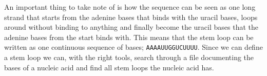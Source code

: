 An important thing to take note of is how the sequence can be seen as one 
long strand that starts from the adenine bases that binds with the uracil bases, 
loops around without binding to anything and finally become the uracil bases 
that the adenine bases from the start binds with. This means that the 
stem loop can be written as one continuous sequence of bases; {\tt AAAAUUGGUCUUUU}. 
Since we can define a stem loop we can, with the right tools, search through 
a file documenting the bases of a nucleic acid and find all stem loops 
the nucleic acid has.

